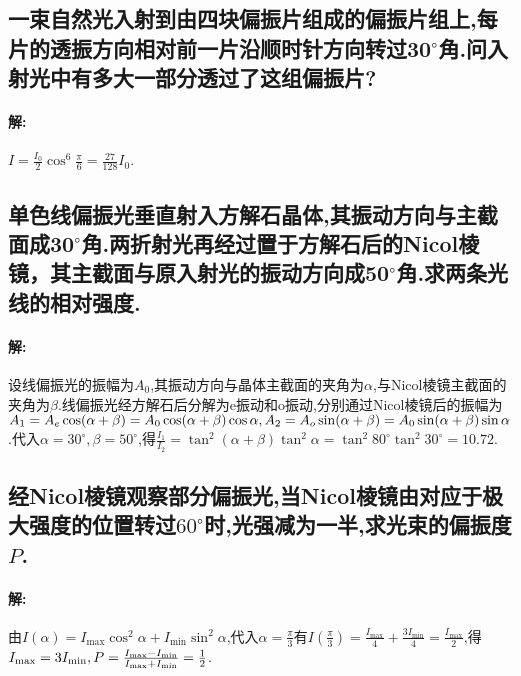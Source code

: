 \documentclass[UTF8]{article}
\begin{document}
    \subsection{一束自然光入射到由四块偏振片组成的偏振片组上,每片的透振方向相对前一片沿顺时针方向转过30$^\circ$角.问入射光中有多大一部分透过了这组偏振片?} %
    \paragraph{解: }$I=\frac{I_0}{2}\cos^6 \frac{\pi}{6}=\frac{27}{128}I_0$.

    \setcounter{subsection}{32}
    \subsection{单色线偏振光垂直射入方解石晶体,其振动方向与主截面成30$^\circ$角.两折射光再经过置于方解石后的Nicol棱镜，其主截面与原入射光的振动方向成50$^\circ$角.求两条光线的相对强度.} %
    \paragraph{解: }设线偏振光的振幅为$A_0$,其振动方向与晶体主截面的夹角为$\alpha$,与Nicol棱镜主截面的夹角为$\beta$.线偏振光经方解石后分解为e振动和o振动,分别通过Nicol棱镜后的振幅为$A_1=A_e\cos(\alpha+\beta)=A_0\cos(\alpha+\beta)\cos\alpha,\\ A_2=A_o\sin(\alpha+\beta)=A_0\sin(\alpha+\beta)\sin\alpha$.代入$\alpha=30^\circ,\beta=50^\circ$,得$\frac{I_1}{I_2}=\tan^2(\alpha+\beta)\tan^2\alpha=\tan^2 80^\circ \tan^2 30^\circ=10.72$.


    \subsection{经$\!\!$Nicol$\!\!$棱镜观察部分偏振光,当$\!\!$Nicol$\!\!$棱镜由对应于极大强度的位置转过$\!\!60^\circ\!\!$时,光强减为一半,求光束的偏振度$P$.} %
    \paragraph{解: }由$I(\alpha)=I_{\mathrm{max}}\cos^2\alpha+I_{\mathrm{min}}\sin^2\alpha$,代入$\alpha=\frac{\pi}{3}$有$I(\frac{\pi}{3})=\frac{I_{\mathrm{max}}}{4}+\frac{3I_{\mathrm{min}}}{4}=\frac{I_{\mathrm{max}}}{2}$,得$I_{\mathrm{max}}=3I_{\mathrm{min}},\\ P=\frac{I_{\mathrm{max}}-I_{\mathrm{min}}}{I_{\mathrm{max}}+I_{\mathrm{min}}}=\frac{1}{2}$.

    \setcounter{subsection}{37}
\end{document}
